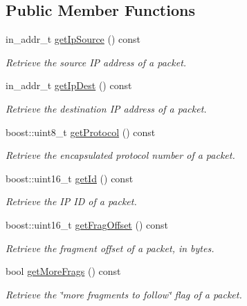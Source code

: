 \subsection*{\-Public \-Member \-Functions}
\begin{DoxyCompactItemize}
\item 
in\-\_\-addr\-\_\-t \hyperlink{classIPQ_1_1IpqIpPacket_a4708c5a987eb9796566e2b3bdd072589}{get\-Ip\-Source} () const 
\begin{DoxyCompactList}\small\item\em \-Retrieve the source \-I\-P address of a packet. \end{DoxyCompactList}\item 
in\-\_\-addr\-\_\-t \hyperlink{classIPQ_1_1IpqIpPacket_a056bedcbf7998452d147f2d2ef68b611}{get\-Ip\-Dest} () const 
\begin{DoxyCompactList}\small\item\em \-Retrieve the destination \-I\-P address of a packet. \end{DoxyCompactList}\item 
boost\-::uint8\-\_\-t \hyperlink{classIPQ_1_1IpqIpPacket_aefa78bb7a89a337bb0c1d88c02d6d5cd}{get\-Protocol} () const 
\begin{DoxyCompactList}\small\item\em \-Retrieve the encapsulated protocol number of a packet. \end{DoxyCompactList}\item 
boost\-::uint16\-\_\-t \hyperlink{classIPQ_1_1IpqIpPacket_a937be4034dafdce171b7e90ae14f09d4}{get\-Id} () const 
\begin{DoxyCompactList}\small\item\em \-Retrieve the \-I\-P \-I\-D of a packet. \end{DoxyCompactList}\item 
boost\-::uint16\-\_\-t \hyperlink{classIPQ_1_1IpqIpPacket_a97e6e13ede2c6c6f028ee0eb1130600b}{get\-Frag\-Offset} () const 
\begin{DoxyCompactList}\small\item\em \-Retrieve the fragment offset of a packet, in bytes. \end{DoxyCompactList}\item 
bool \hyperlink{classIPQ_1_1IpqIpPacket_a76e0d09916fc816df3dab46cb29d479f}{get\-More\-Frags} () const 
\begin{DoxyCompactList}\small\item\em \-Retrieve the \char`\"{}more fragments to follow\char`\"{} flag of a packet. \end{DoxyCompactList}\item 

\end{DoxyCompactItemize}
